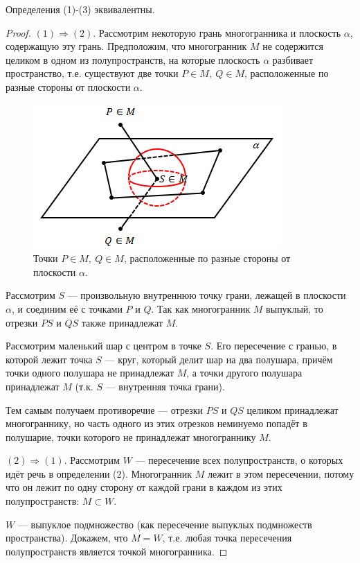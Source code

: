 \begin{theorem}
    Определения (1)-(3) эквивалентны.
\end{theorem}
\begin{proof}
    $(1) \Longrightarrow (2)$. Рассмотрим некоторую грань многогранника и плоскость $\alpha$, содержащую эту грань. Предположим, что многогранник $M$ не содержится целиком в одном из полупространств, на которые плоскость $\alpha$ разбивает пространство, т.е. существуют две точки $P \in M, \ Q \in M$, расположенные по разные стороны от плоскости $\alpha$.
    \begin{figure}[h]
        \centering
        \includegraphics[scale=0.8]{images/c6.4.png}
        \caption{Точки $P \in M, \ Q \in M$, расположенные по разные стороны от плоскости $\alpha$.}
        \label{fig:c6.4}
    \end{figure}
    Рассмотрим $S$ — произвольную внутреннюю точку грани, лежащей в плоскости $\alpha$, и соединим её с точками $P$ и $Q$. Так как многогранник $M$ выпуклый, то отрезки $PS$ и $QS$ также принадлежат $M$.

    Рассмотрим маленький шар с центром в точке $S$. Его пересечение с гранью, в которой лежит точка $S$ — круг, который делит шар на два полушара, причём точки одного полушара не принадлежат $M$, а точки другого полушара принадлежат $M$ (т.к. $S$ — внутренняя точка грани).

    Тем самым получаем противоречие — отрезки $PS$ и $QS$ целиком принадлежат многограннику, но часть одного из этих отрезков неминуемо попадёт в полушарие, точки которого не принадлежат многограннику $M$.

    $(2) \Longrightarrow (1)$. Рассмотрим $W$ — пересечение всех полупространств, о которых идёт речь в определении (2). Многогранник $M$ лежит в этом пересечении, потому что он лежит по одну сторону от каждой грани в каждом из этих полупространств: $M \subset W$.

    $W$ — выпуклое подмножество (как пересечение выпуклых подмножеств пространства). Докажем, что $M = W$, т.е. любая точка пересечения полупространств является точкой многогранника.


\end{proof}
